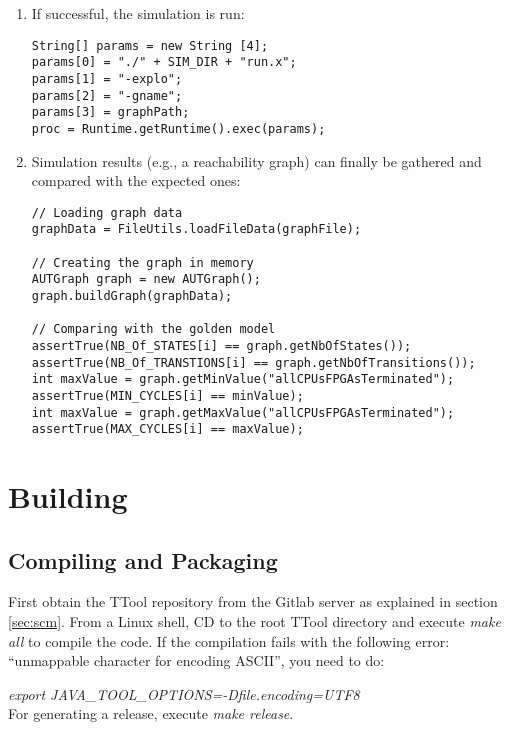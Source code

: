 \documentclass[12pt]{article}
\begin{document}
\begin{enumerate}
\item If successful, the simulation is run:
\begin{verbatim}
String[] params = new String [4];
params[0] = "./" + SIM_DIR + "run.x";
params[1] = "-explo";
params[2] = "-gname";
params[3] = graphPath;
proc = Runtime.getRuntime().exec(params);
\end{verbatim}

\item Simulation results (e.g., a reachability graph) can finally be gathered and compared with the expected ones:
\begin{verbatim}
// Loading graph data
graphData = FileUtils.loadFileData(graphFile);

// Creating the graph in memory
AUTGraph graph = new AUTGraph();
graph.buildGraph(graphData);

// Comparing with the golden model
assertTrue(NB_Of_STATES[i] == graph.getNbOfStates());
assertTrue(NB_Of_TRANSTIONS[i] == graph.getNbOfTransitions());
int maxValue = graph.getMinValue("allCPUsFPGAsTerminated");
assertTrue(MIN_CYCLES[i] == minValue);
int maxValue = graph.getMaxValue("allCPUsFPGAsTerminated");
assertTrue(MAX_CYCLES[i] == maxValue);
\end{verbatim}
\end{enumerate}



\newpage

\section{Building}

\subsection{Compiling and Packaging}

First obtain the TTool repository from the Gitlab server as explained in section
\ref{sec:scm}. From a Linux shell, CD to the root TTool directory and execute
\emph{make all} to compile the code. If the compilation fails with the following error:
``unmappable character for encoding ASCII'', you need to do:

\emph{export JAVA\_TOOL\_OPTIONS=-Dfile.encoding=UTF8} \\

For generating a release, execute \emph{make release}.
\end{document}
